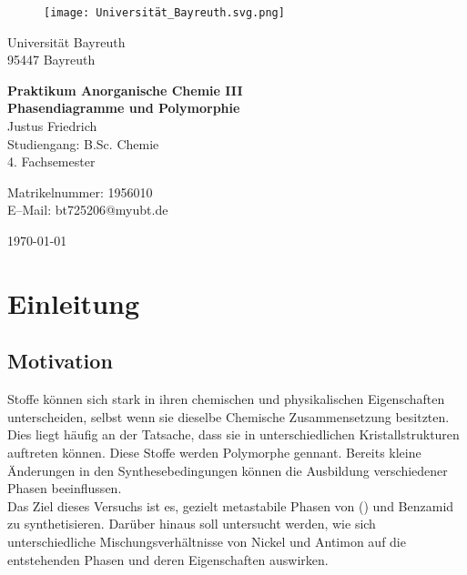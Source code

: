 \documentclass[12pt, a4paper]{article}
\begin{document}
\begin{figure}
    \texttt{[image: Universität\_Bayreuth.svg.png]}
\end{figure}



{\raggedright Universität Bayreuth\\  95447 Bayreuth}


\vspace{5cm}

\begin{center}
{\LARGE\bf{Praktikum Anorganische Chemie III}} \\  
\vspace{1cm}
{\Large\bf{Phasendiagramme und Polymorphie}}\\
\vspace{0.5cm}
{\large Justus Friedrich\\}
{Studiengang: B.Sc. Chemie\\}
{4. Fachsemester}
\end{center}





\thispagestyle{empty}
\begin{center}
{\small Matrikelnummer: 1956010 \\
E–Mail:  bt725206@myubt.de}
\end{center}

\vspace{5cm}

\today


\newpage
\tableofcontents
\thispagestyle{empty}


\newpage
\setcounter{page}{1}
\section{Einleitung}



\subsection{Motivation}
Stoffe können sich stark in ihren chemischen und physikalischen Eigenschaften unterscheiden, selbst wenn sie dieselbe Chemische Zusammensetzung besitzten. Dies liegt häufig an der Tatsache, dass sie in unterschiedlichen Kristallstrukturen auftreten können. Diese Stoffe werden Polymorphe gennant. Bereits kleine Änderungen in den Synthesebedingungen können die Ausbildung verschiedener Phasen beeinflussen. \\
\noindent
Das Ziel dieses Versuchs ist es, gezielt metastabile Phasen von () und Benzamid zu synthetisieren. Darüber hinaus soll untersucht werden, wie sich unterschiedliche Mischungsverhältnisse von Nickel und Antimon auf die entstehenden Phasen und deren Eigenschaften auswirken.\cite{Skript}
\end{document}
